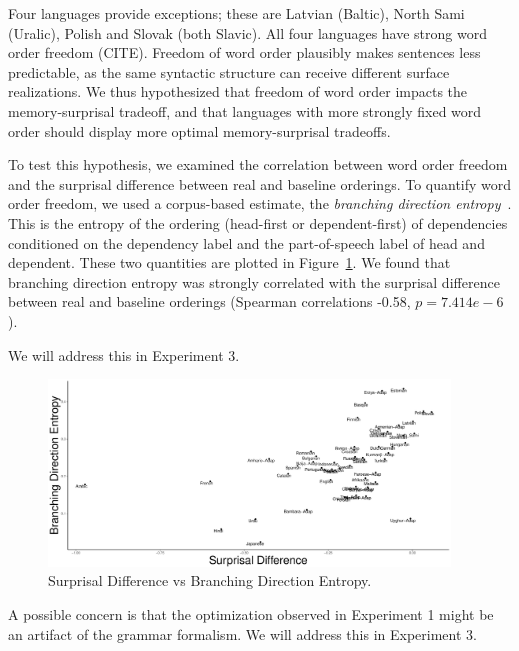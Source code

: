 Four languages provide exceptions; these are Latvian (Baltic), North Sami (Uralic), Polish and Slovak (both Slavic).
All four languages have strong word order freedom (CITE).
Freedom of word order plausibly makes sentences less predictable, as the same syntactic structure can receive different surface realizations.
We thus hypothesized that freedom of word order impacts the memory-surprisal tradeoff, and that languages with more strongly fixed word order should display more optimal memory-surprisal tradeoffs.

To test this hypothesis, we examined the correlation between word order freedom and the surprisal difference between real and baseline orderings.
To quantify word order freedom, we used a corpus-based estimate, the \emph{branching direction entropy}~\citep{futrell-quantifying-2015}.
This is the entropy of the ordering (head-first or dependent-first) of dependencies conditioned on the dependency label and the part-of-speech label of head and dependent.
These two quantities are plotted in Figure~\ref{fig:hist-real}.
We found that branching direction entropy was strongly correlated with the surprisal difference between real and baseline orderings (Spearman correlations -0.58, $p = 7.414e-6$).

We will address this in Experiment 3.


\begin{figure}
\includegraphics[width=0.95\textwidth]{figures/surprisal-branching-entropy-REAL.pdf}
	\caption{Surprisal Difference vs Branching Direction Entropy.}\label{fig:hist-real}
\end{figure}





A possible concern is that the optimization observed in Experiment 1 might be an artifact of the grammar formalism.
We will address this in Experiment 3.


